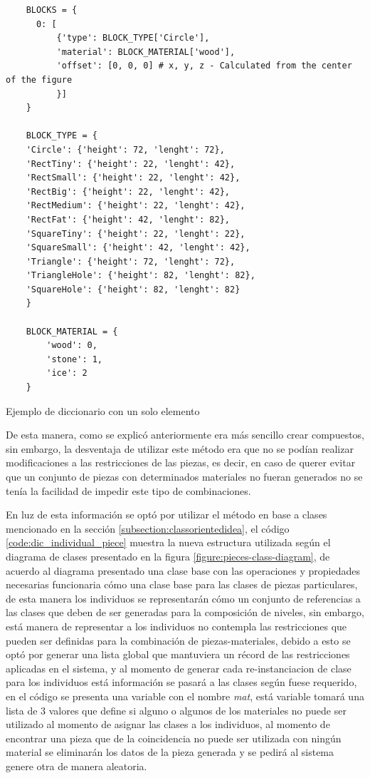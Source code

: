 \begin{listing}[t]
  \begin{verbatim}
    BLOCKS = {
      0: [
          {'type': BLOCK_TYPE['Circle'],
          'material': BLOCK_MATERIAL['wood'],
          'offset': [0, 0, 0] # x, y, z - Calculated from the center of the figure
          }]
    }

    BLOCK_TYPE = {
    'Circle': {'height': 72, 'lenght': 72},
    'RectTiny': {'height': 22, 'lenght': 42},
    'RectSmall': {'height': 22, 'lenght': 42},
    'RectBig': {'height': 22, 'lenght': 42},
    'RectMedium': {'height': 22, 'lenght': 42},
    'RectFat': {'height': 42, 'lenght': 82},
    'SquareTiny': {'height': 22, 'lenght': 22},
    'SquareSmall': {'height': 42, 'lenght': 42},
    'Triangle': {'height': 72, 'lenght': 72},
    'TriangleHole': {'height': 82, 'lenght': 82},
    'SquareHole': {'height': 82, 'lenght': 82}
    }

    BLOCK_MATERIAL = {
        'wood': 0,
        'stone': 1,
        'ice': 2
    }
  \end{verbatim}
  \caption{Ejemplo de diccionario con un solo elemento}
  \label{code:dic_individual_piece}
\end{listing}

De esta manera, como se explicó anteriormente era más sencillo crear compuestos,
sin embargo, la desventaja de utilizar este método era que no se podían
realizar modificaciones a las restricciones de las piezas, es decir, en caso de
querer evitar que un conjunto de piezas con determinados materiales no fueran
generados no se tenía la facilidad de impedir este tipo de combinaciones.

En luz de esta información se optó por utilizar el método en base a clases
mencionado en la sección \ref{subsection:classorientedidea}, el código
\ref{code:dic_individual_piece} muestra la nueva estructura utilizada según el
diagrama de clases presentado en la figura \ref{figure:pieces-class-diagram},
de acuerdo al diagrama presentado una clase base con las operaciones y
propiedades necesarias funcionaria cómo una clase base para las clases
de piezas particulares, de esta manera los individuos se representarán cómo un
conjunto de referencias a las clases que deben de ser generadas para la
composición de niveles, sin embargo, está manera de representar a los individuos
no contempla las restricciones que pueden ser definidas para la combinación de
piezas-materiales, debido a esto se optó por generar una lista global que
mantuviera un récord de las restricciones aplicadas en el sistema, y al momento
de generar cada re-instanciacion de clase para los individuos está información se
pasará a las clases según fuese requerido, en el código se presenta una variable
con el nombre \textit{mat}, está variable tomará una lista de 3 valores que
define si alguno o algunos de los materiales no puede ser utilizado al momento
de asignar las clases a los individuos, al momento de encontrar una pieza que de
la coincidencia no puede ser utilizada con ningún material se eliminarán los
datos de la pieza generada y se pedirá al sistema genere otra de manera aleatoria.

